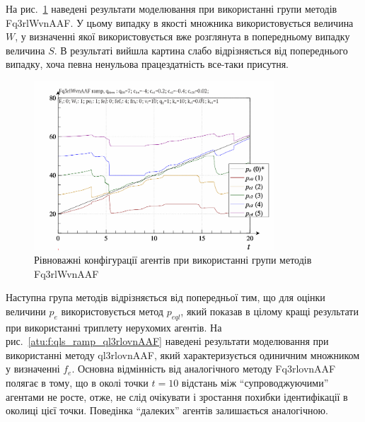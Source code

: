 На рис.~\ref{atu:f:qls_ramp_Fq3rlWvnAAF} наведені результати моделювання при
використанні групи методів Fq3rlWvnAAF. У цьому випадку в якості множника
використовується величина
$W$, у визначенні якої використовується вже розглянута в
попередньому випадку величина
$S$. В результаті вийшла картина слабо відрізняється від
попереднього випадку, хоча певна ненульова працездатність
все-таки присутня.

\begin{figure}[htb!]
  \begin{center}
    \includegraphics[width=0.8\textwidth]{p/ramp/qls-p_t_pi_Fq3rlWvnAAF_ramp.png}
  \end{center}
  \caption{Рівноважні конфігурації агентів при використанні групи методів Fq3rlWvnAAF}
  \label{atu:f:qls_ramp_Fq3rlWvnAAF}
\end{figure}

Наступна група методів відрізняється від попередньої тим, що
для оцінки величини
$p_e$ використовується метод
$p_{eql} $, який показав в цілому кращі результати при використанні
триплету нерухомих агентів. На рис.~\ref{atu:f:qls_ramp_ql3rlovnAAF} наведені
результати моделювання при використанні методу ql3rlovnAAF, який
характеризується одиничним множником у визначенні
$f_e$. Основна відмінність від аналогічного методу Fq3rlovnAAF полягає
в тому, що в околі точки
$ t = 10 $ відстань між ``супроводжуючими'' агентами не росте, отже, не
слід очікувати і зростання похибки ідентифікації в околиці цієї
точки. Поведінка ``далеких'' агентів залишається аналогічною.


